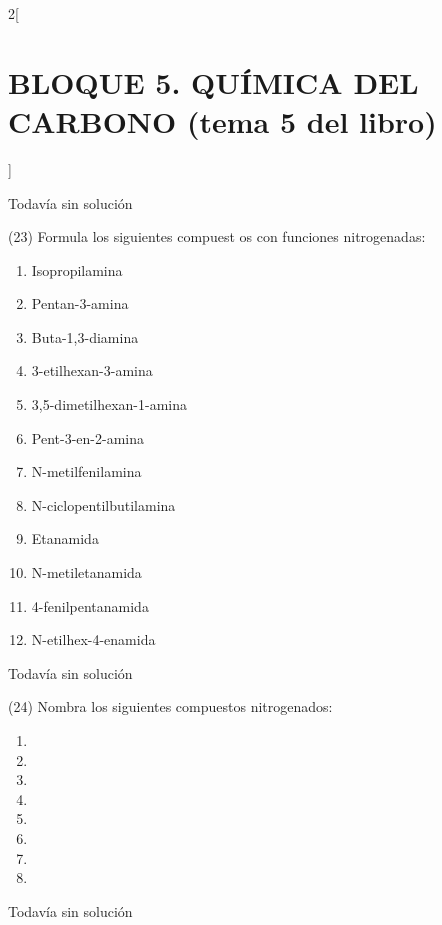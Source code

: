 \documentclass[10pt]{article}
\begin{document}
\begin{multicols}{2}[
  \section{BLOQUE 5. QUÍMICA DEL CARBONO (tema 5 del libro)}
  ]
\begin{solution}[print=false]
  Todavía sin solución
\end{solution}

\begin{exercise}
  (23) Formula los siguientes compuest os con funciones nitrogenadas:
  \begin{enumerate}
    \item Isopropilamina
    \item Pentan-3-amina
    \item Buta-1,3-diamina
    \item 3-etilhexan-3-amina
    \item 3,5-dimetilhexan-1-amina
    \item Pent-3-en-2-amina
    \item N-metilfenilamina
    \item N-ciclopentilbutilamina
    \item Etanamida
    \item N-metiletanamida
    \item 4-fenilpentanamida
    \item N-etilhex-4-enamida
  \end{enumerate}
\end{exercise}

\begin{solution}[print=false]
  Todavía sin solución
\end{solution}

\begin{exercise}
  (24) Nombra los siguientes compuestos nitrogenados:
  \begin{enumerate}
    \item {}
    \item {}
    \item {}
    \item {}
    \item {}
    \item {}
    \item {}
    \item {}
  \end{enumerate}
\end{exercise}

\begin{solution}[print=false]
  Todavía sin solución
\end{solution}


\end{multicols}
\end{document}
